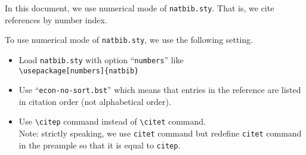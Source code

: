 \documentclass[10pt]{article}
\renewcommand{\citet}[1]{\citep{#1}}
\begin{document}
In this document, we use numerical mode of \texttt{natbib.sty}. That is, we cite
references by number index.
\vspace*{1em}

To use numerical mode of \texttt{natbib.sty}, we use the following setting.
\begin{itemize}
 \item Load \texttt{natbib.sty} with option ``\texttt{numbers}'' like \\
       \verb|\usepackage[numbers]{natbib}|
 \item Use ``\verb|econ-no-sort.bst|'' which means that entries in the reference
       are listed in citation order (not alphabetical order).
 \item Use \verb|\citep| command instead of \verb|\citet| command.\\ Note:
       strictly speaking, we use \texttt{citet} command but redefine
       \texttt{citet} command in the preample so that it is equal to
       \texttt{citep}.
\end{itemize}

\vspace{1em}


\nocite{*}



\end{document}
